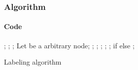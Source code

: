 \begin{frame}
  \frametitle{Algorithm}
  \framesubtitle{Code}
  \begin{algorithm}[H]
    \scriptsize
    \begin{algorithmic}[1]
      \REQUIRE {}
      \STATE {};
      \STATE {};
      \STATE {};
      \label{algo1:setp:main_while}
        \STATE Let  be a  arbitrary node;
        \label{algo1:setp:explore_arcs}
          \STATE {};
              \STATE {};
            \ENDIF
          \ENDFOR
          \STATE {};
            \STATE {};
          \ENDIF
        \ENDFOR
        \STATE {};
      \ENDWHILE
      \RETURN {} if  else \blue{$\infty$};
    \end{algorithmic}
    \caption{Labeling algorithm}
    \label{alg:seq}
  \end{algorithm}
\end{frame}

